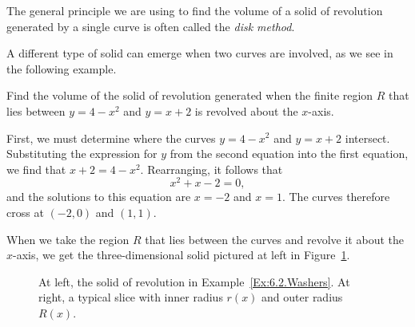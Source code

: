 The general principle we are using to find the volume of a solid of revolution generated by a single curve is often called the \emph{disk method}.

\vspace*{5pt}
\nin {}
\vspace*{1pt}

A different type of solid can emerge when two curves are involved, as we see in the following example.

\bex \label{Ex:6.2.Washers}
Find the volume of the solid of revolution generated when the finite region $R$ that lies between $y = 4-x^2$ and $y = x+2$ is revolved about the $x$-axis.
\eex

First, we must determine where the curves $y = 4-x^2$ and $y = x+2$ intersect.  Substituting the expression for $y$ from the second equation into the first equation, we find that $x + 2 = 4-x^2$.  Rearranging, it follows that
$$x^2 + x - 2 = 0,$$
and the solutions to this equation are $x = -2$ and $x = 1$.  The curves therefore cross at $(-2,0)$ and $(1,1)$.

When we take the region $R$  that lies between the curves and revolve it about the $x$-axis, we get the three-dimensional solid pictured at left in Figure~\ref{F:6.2.Ex2}.

\begin{figure}[h]
\begin{center}
 \hspace{0.25in} 
\caption{At left, the solid of revolution in Example~\ref{Ex:6.2.Washers}.  At right, a typical slice with inner radius $r(x)$ and outer radius $R(x)$.} \label{F:6.2.Ex2}
\end{center}
\end{figure}

